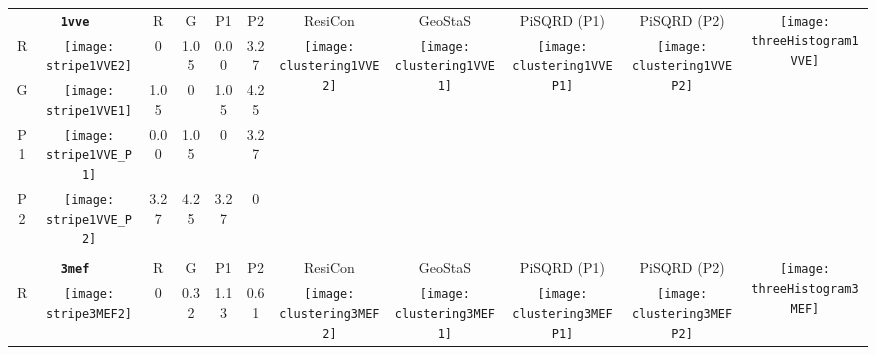 \documentclass[a4paper,11pt,twoside]{book}%
\begin{document}
\begin{appendices}
\begin{sidewaystable}[h!]
\sffamily
\begin{tabular*}{4cm}{cc|c|c|c|c|c|c|c|c|c|}
\cline{1-11}
\multicolumn{2}{|c|}{{\bf \texttt{1vve}}} & R & G & P1 & P2 & ResiCon & GeoStaS & PiSQRD (P1) & PiSQRD (P2) & \multirow{5}{*}{\vspace{-0.15cm}\texttt{[image: threeHistogram1VVE]}}  \\
\cline{1-10}
\multicolumn{1}{|c|}{R} & \texttt{[image: stripe1VVE2]} & 0 & 1.05 & 0.00 & 3.27 & \multirow{4}{*}{\vspace{-0.3cm}\texttt{[image: clustering1VVE2]}} & \multirow{4}{*}{\vspace{-0.3cm}\texttt{[image: clustering1VVE1]}} & \multirow{4}{*}{\vspace{-0.3cm}\texttt{[image: clustering1VVEP1]}} & \multirow{4}{*}{\vspace{-0.3cm}\texttt{[image: clustering1VVEP2]}} &  \multirow{5}{*}{} \\
\cline{1-6}
\multicolumn{1}{|c|}{G} & \texttt{[image: stripe1VVE1]} & 1.05 & 0 & 1.05 & 4.25 & \multirow{4}{*}{} & \multirow{4}{*}{} & \multirow{4}{*}{} & \multirow{4}{*}{} & \multirow{5}{*}{} \\
\cline{1-6}
\multicolumn{1}{|c|}{P1} & \texttt{[image: stripe1VVE\_P1]} & 0.00 & 1.05 & 0 & 3.27 & \multirow{4}{*}{} & \multirow{4}{*}{} & \multirow{4}{*}{} & \multirow{4}{*}{} & \multirow{5}{*}{}  \\
\cline{1-6}
\multicolumn{1}{|c|}{P2} & \texttt{[image: stripe1VVE\_P2]} & 3.27 & 4.25 & 3.27 & 0 & \multirow{4}{*}{} & \multirow{4}{*}{} & \multirow{4}{*}{} & \multirow{4}{*}{} & \multirow{5}{*}{}  \\
\cline{1-11}
\\
\cline{1-11}
\multicolumn{2}{|c|}{{\bf \texttt{3mef}}} & R & G & P1 & P2 & ResiCon & GeoStaS & PiSQRD (P1) & PiSQRD (P2) & \multirow{5}{*}{\vspace{-0.15cm}\texttt{[image: threeHistogram3MEF]}}  \\
\cline{1-10}
\multicolumn{1}{|c|}{R} & \texttt{[image: stripe3MEF2]} & 0 & 0.32 & 1.13 & 0.61 & \multirow{4}{*}{\vspace{-0.3cm}\texttt{[image: clustering3MEF2]}} & \multirow{4}{*}{\vspace{-0.3cm}\texttt{[image: clustering3MEF1]}} & \multirow{4}{*}{\vspace{-0.3cm}\texttt{[image: clustering3MEFP1]}} & \multirow{4}{*}{\vspace{-0.3cm}\texttt{[image: clustering3MEFP2]}} &  \multirow{5}{*}{} \\

\end{tabular*}
\end{sidewaystable}
\end{appendices}
\end{document}
